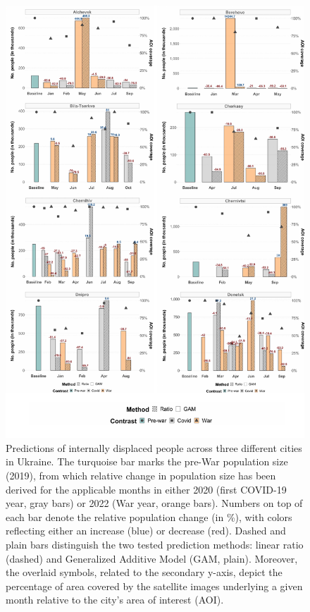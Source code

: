 \documentclass[sn-basic]{sn-jnl}%
\begin{document}
{\begin{appendices}
\begin{figure}[h!]
\begin{center}
\includegraphics[scale = 0.6]{Figures/SM_IDP_pred_Fig1.pdf}
\end{center}
\caption{Predictions of internally displaced people across three different cities in Ukraine. The turquoise bar marks the pre-War population size (2019), from which relative change in population size has been derived for the applicable months in either 2020 (first COVID-19 year, gray bars) or 2022 (War year, orange bars). Numbers on top of each bar denote the relative population change (in \%), with colors reflecting either an increase (blue) or decrease (red). Dashed and plain bars distinguish the two tested prediction methods: linear ratio (dashed) and Generalized Additive Model (GAM, plain). Moreover, the overlaid symbols, related to the secondary y-axis, depict the percentage of area covered by the satellite images underlying a given month relative to the city's area of interest (AOI).}
\label{figSM_IDP_pred_Fig1}
\end{figure}


\end{appendices}}
\end{document}
